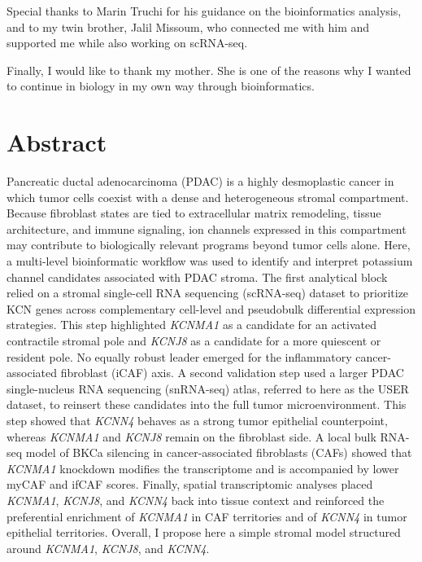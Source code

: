 \documentclass[11pt,a4paper]{article}
\begin{document}
Special thanks to Marin Truchi for his guidance on the bioinformatics analysis, and to my twin brother, Jalil Missoum, who connected me with him and supported me while also working on scRNA-seq.

Finally, I would like to thank my mother. She is one of the reasons why I wanted to continue in biology in my own way through bioinformatics. 

\clearpage
{}
\section*{Abstract}
Pancreatic ductal adenocarcinoma (PDAC) is a highly desmoplastic cancer in which tumor cells coexist with a dense and heterogeneous stromal compartment. Because fibroblast states are tied to extracellular matrix remodeling, tissue architecture, and immune signaling, ion channels expressed in this compartment may contribute to biologically relevant programs beyond tumor cells alone. Here, a multi-level bioinformatic workflow was used to identify and interpret potassium channel candidates associated with PDAC stroma. The first analytical block relied on a stromal single-cell RNA sequencing (scRNA-seq) dataset to prioritize KCN genes across complementary cell-level and pseudobulk differential expression strategies. This step highlighted \textit{KCNMA1} as a candidate for an activated contractile stromal pole and \textit{KCNJ8} as a candidate for a more quiescent or resident pole. No equally robust leader emerged for the inflammatory cancer-associated fibroblast (iCAF) axis. A second validation step used a larger PDAC single-nucleus RNA sequencing (snRNA-seq) atlas, referred to here as the USER dataset, to reinsert these candidates into the full tumor microenvironment. This step showed that \textit{KCNN4} behaves as a strong tumor epithelial counterpoint, whereas \textit{KCNMA1} and \textit{KCNJ8} remain on the fibroblast side. A local bulk RNA-seq model of BKCa silencing in cancer-associated fibroblasts (CAFs) showed that \textit{KCNMA1} knockdown modifies the transcriptome and is accompanied by lower myCAF and ifCAF scores. Finally, spatial transcriptomic analyses placed \textit{KCNMA1}, \textit{KCNJ8}, and \textit{KCNN4} back into tissue context and reinforced the preferential enrichment of \textit{KCNMA1} in CAF territories and of \textit{KCNN4} in tumor epithelial territories. Overall, I propose here a simple stromal model structured around \textit{KCNMA1}, \textit{KCNJ8}, and \textit{KCNN4}.
\end{document}
